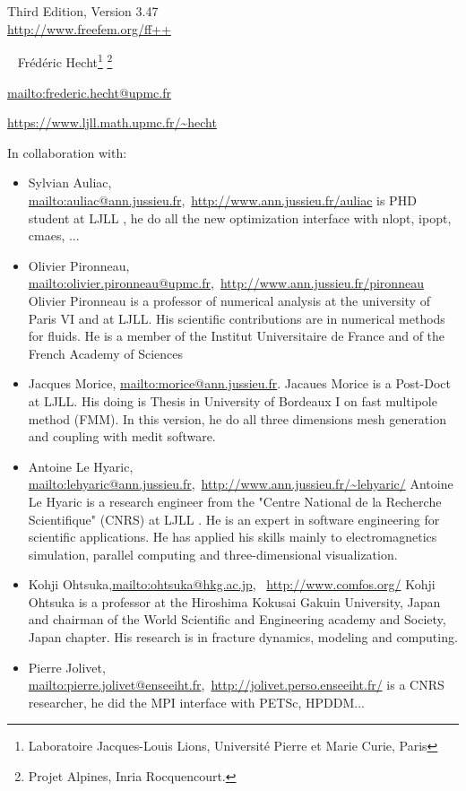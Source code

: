 \documentclass[a4paper,twoside,12pt]{book}
\def\VERSION{3.47}
\begin{document}
\begin{center}
 {} \\ \vglue 0.0cm  ~ \\
   Third Edition, Version \VERSION
 \\ \vglue 0.7cm
 {\Large \url{http://www.freefem.org/ff++}} \\
\vglue 0.5cm

 \
{ Fr\'{e}d\'{e}ric Hecht\footnote{Laboratoire Jacques-Louis Lions, Universit\'{e} Pierre et Marie Curie, Paris}
\footnote{Projet Alpines, Inria Rocquencourt.} }

\url{mailto:frederic.hecht@upmc.fr}

\url{https://www.ljll.math.upmc.fr/~hecht}


\bigskip

In collaboration with:
{\small
\begin{itemize}
\item {\normalsize Sylvian Auliac}, \url{mailto:auliac@ann.jussieu.fr},~\url{http://www.ann.jussieu.fr/auliac}
{is PHD student at LJLL  , he do all the new optimization interface with nlopt, ipopt, cmaes, ...}

\item {\normalsize Olivier Pironneau}, \url{mailto:olivier.pironneau@upmc.fr},~\url{http://www.ann.jussieu.fr/pironneau}
{Olivier Pironneau is a professor of numerical analysis at the university of Paris VI and at LJLL.  His scientific contributions are in numerical methods for fluids.  He is a member of the Institut Universitaire de France and of the French  Academy of Sciences}
\item {\normalsize Jacques Morice}, \url{mailto:morice@ann.jussieu.fr}.
Jacaues Morice is a Post-Doct at LJLL. His doing is Thesis in University of Bordeaux I on fast multipole method (FMM).
In this version, he do all three dimensions mesh generation and coupling with medit software.
\item {\normalsize Antoine Le Hyaric}, \url{mailto:lehyaric@ann.jussieu.fr},~\url{http://www.ann.jussieu.fr/~lehyaric/}
{Antoine Le Hyaric}{ is a research engineer  from the "Centre National de la
Recherche Scientifique" (CNRS) at LJLL . He is an expert in software engineering
for scientific applications. He has applied his skills mainly to
electromagnetics simulation, parallel computing and three-dimensional
visualization.}
\item {\normalsize Kohji Ohtsuka},\url{mailto:ohtsuka@hkg.ac.jp},~ \url{http://www.comfos.org/}
{Kohji Ohtsuka}{ is a professor at the Hiroshima Kokusai Gakuin University, Japan and chairman of the World Scientific and Engineering academy and Society, Japan chapter.  His research is in fracture dynamics, modeling and computing.}
\item {\normalsize Pierre  Jolivet}, \url{mailto:pierre.jolivet@enseeiht.fr},~\url{http://jolivet.perso.enseeiht.fr/}
{is a CNRS researcher, he did the MPI interface with PETSc, HPDDM...}

\end{itemize}}
\end{center}
\end{document}
